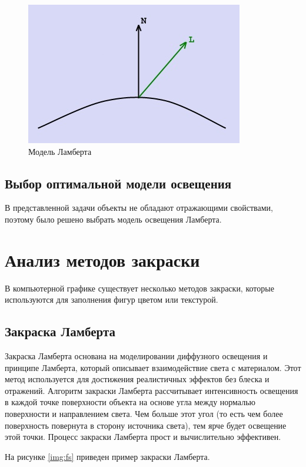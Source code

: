 \begin{figure}[H]
	\begin{center}
		\includegraphics[scale=0.9]{img/lambert.jpg}
	\end{center}
	\captionsetup{justification=centering}
	\caption{Модель Ламберта}
	\label{img:lambert}
\end{figure}

\subsection{Выбор оптимальной модели освещения}
В представленной задачи объекты не обладают отражающими 
свойствами, поэтому было решено выбрать модель освещения Ламберта.

\section{Анализ методов закраски}
В компьютерной графике существует несколько методов закраски, 
которые используются для заполнения фигур цветом или текстурой.

\subsection{Закраска Ламберта}
Закраска Ламберта основана на моделировании диффузного освещения и 
принципе Ламберта, который описывает взаимодействие света с материалом. 
Этот метод используется для достижения реалистичных эффектов без блеска и 
отражений. Алгоритм закраски Ламберта рассчитывает интенсивность 
освещения в каждой точке поверхности объекта на основе угла между 
нормалью поверхности и направлением света. Чем больше этот угол (то есть 
чем более поверхность повернута в сторону источника света), тем ярче будет 
освещение этой точки. Процесс закраски Ламберта прост и вычислительно 
эффективен.

На рисунке \ref{img:fs} приведен пример закраски Ламберта.

